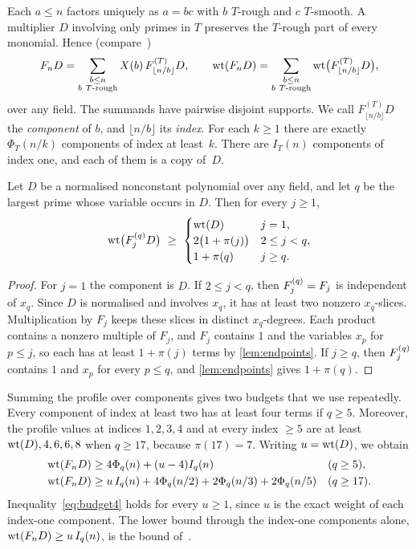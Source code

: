 Each $a\le n$ factors uniquely as $a=bc$ with $b$ $T$-rough and $c$ $T$-smooth. A multiplier $D$ involving only primes in $T$ preserves the $T$-rough part of every monomial. Hence (compare~\cite[Lemma~2.4]{HP})
\begin{equation}\label{eq:rough-decomposition}
 F_nD=\sum_{\substack{b\le n\\ b\ T\text{-rough}}}X(b)\,F^{(T)}_{\lfloor n/b\rfloor}D,
 \qquad
 \wt(F_nD)=\sum_{\substack{b\le n\\ b\ T\text{-rough}}}\wt\bigl(F^{(T)}_{\lfloor n/b\rfloor}D\bigr),
\end{equation}
over any field. The summands have pairwise disjoint supports. We call $F^{(T)}_{\lfloor n/b\rfloor}D$ the \emph{component} of $b$, and $\lfloor n/b\rfloor$ its \emph{index}. For each $k\ge1$ there are exactly $\Phi_T(n/k)$ components of index at least~$k$. There are $I_T(n)$ components of index one, and each of them is a copy of~$D$.

\begin{lemma}\label{lem:profile}
Let $D$ be a normalised nonconstant polynomial over any field, and let $q$ be the largest prime whose variable occurs in $D$. Then for every $j\ge1$,
\[
 \operatorname{wt}\bigl(F_{j}^{(q)} D\bigr)\ \ge\
 \begin{cases}
 \operatorname{wt}(D) & j=1,\\
 2\bigl(1+\pi(j)\bigr) & 2\le j<q,\\
 1+\pi(q) & j\ge q.
 \end{cases}
\]
\end{lemma}

\begin{proof}
For $j=1$ the component is $D$. If $2\le j<q$, then $F_{j}^{(q)}=F_j$ is independent of $x_q$. Since $D$ is normalised and involves $x_q$, it has at least two nonzero $x_q$-slices. Multiplication by $F_j$ keeps these slices in distinct $x_q$-degrees. Each product contains a nonzero multiple of $F_j$, and $F_j$ contains $1$ and the variables $x_p$ for $p\le j$, so each has at least $1+\pi(j)$ terms by \cref{lem:endpoints}. If $j\ge q$, then $F_{j}^{(q)}$ contains $1$ and $x_p$ for every $p\le q$, and \cref{lem:endpoints} gives $1+\pi(q)$.
\end{proof}

Summing the profile over components gives two budgets that we use repeatedly. Every component of index at least two has at least four terms if $q\ge5$. Moreover, the profile values at indices $1,2,3,4$ and at every index $\ge5$ are at least $\operatorname{wt}(D),4,6,6,8$ when $q\ge17$, because $\pi(17)=7$. Writing $u=\operatorname{wt}(D)$, we obtain
\begin{align}
 \operatorname{wt}(F_nD)&\ge 4\Phi_q(n)+(u-4)I_q(n) && (q\ge5),\label{eq:budget4}\\
 \operatorname{wt}(F_nD)&\ge u\,I_q(n)+4\Phi_q(n/2)+2\Phi_q(n/3)+2\Phi_q(n/5) && (q\ge17).\label{eq:budget8}
\end{align}
Inequality~\eqref{eq:budget4} holds for every $u\ge1$, since $u$ is the exact weight of each index-one component. The lower bound through the index-one components alone, $\operatorname{wt}(F_nD)\ge u\,I_q(n)$, is the bound of~\cite[Lemma~4.4]{HP}.
